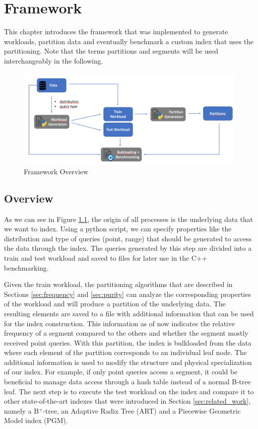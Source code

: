 \thispagestyle{plain}
\chapter{Framework}
This chapter introduces the framework that was implemented to generate workloads, partition data and eventually benchmark a custom index that uses the partitioning. Note that the terms partitions and segments will be used interchangeably in the following.
\begin{figure}[H]
    \centering
    \includegraphics[width=\textwidth]{figures/pipeline.png}
    \caption{Framework Overview}
    \label{fig:framework}
\end{figure}

\section{Overview}
As we can see in Figure \ref{fig:framework}, the origin of all processes is the underlying data that we want to index. Using a python script, we can specify properties like the distribution and type of queries (point, range) that should be generated to access the data through the index. The queries generated by this step are divided into a train and test workload and saved to files for later use in the C++ benchmarking.

Given the train workload, the partitioning algorithms that are described in Sections \ref{sec:frequency} and \ref{sec:purity} can analyze the corresponding properties of the workload and will produce a partition of the underlying data. The resulting elements are saved to a file with additional information that can be used for the index construction. This information as of now indicates the relative frequency of a segment compared to the others and whether the segment mostly received point queries.
With this partition, the index is bulkloaded from the data where each element of the partition corresponds to an individual leaf node. The additional information is used to modify the structure and physical specialization of our index. For example, if only point queries access a segment, it could be beneficial to manage data access through a hash table instead of a normal B-tree leaf. The next step is to execute the test workload on the index and compare it to other state-of-the-art indexes that were introduced in Section \ref{sec:related_work}, namely a B$^+$-tree, an Adaptive Radix Tree (ART) and a Piecewise Geometric Model index (PGM).

